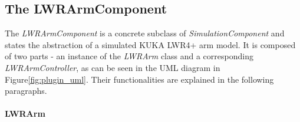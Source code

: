 \subsection{The LWRArmComponent}

The \emph{LWRArmComponent} is a concrete subclass of \emph{SimulationComponent} and states the abstraction of a simulated KUKA LWR4+ arm model. It is composed of two parts - an instance of the \emph{LWRArm} class and a corresponding \emph{LWRArmController}, as can be seen in the UML diagram in Figure\ref{fig:plugin_uml}. Their functionalities are explained in the following paragraphs.

\paragraph{LWRArm}

